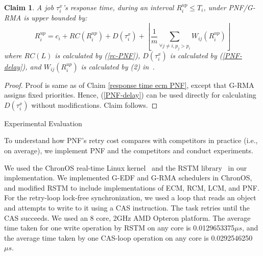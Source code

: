 \documentclass[twocolumn]{article}
\makeatletter
\def\section{\@startsection {section}{1}{\z@}{20pt plus 2pt minus 2pt}
{8pt plus 2pt minus 2pt}{\centering\normalsize\sc
\edef\@svsec{\thesection.\ }}}
\def\thesection{\Roman{section}}
\def\subsection{\@startsection {subsection}{2}{\z@}{16pt plus 2pt minus 2pt}
{6pt plus 2pt minus 2pt}{\normalsize\sl
\edef\@svsec{\thesubsection.\ }}}
\def\thesubsection{\Alph{subsection}}
\newtheorem{clm}{Claim}
\newtheorem{proof}{Proof}
\makeatother
\begin{document}
\begin{clm}\label{response rcm PNF}
A job $\tau_{i}^{x}$'s response time, during an interval $R_i^{up}\le T_{i}$, under PNF/G-RMA is upper bounded by: 
\begin{equation}
R_{i}^{up}=c_{i}+RC(R_i^{up})+D(\tau_{i}^{x})+\left\lfloor \frac{1}{m}\sum_{\forall j\ne i,p_j>p_i}W_{ij}(R_{i}^{up})\right\rfloor 
\end{equation}
where $RC(L)$ is calculated by (\ref{rc-PNF}), $D(\tau_{i}^{x})$
is calculated by (\ref{PNF-delay}), and $W_{ij}(R_{i}^{up})$
is calculated by (2) in~\cite{stmconcurrencycontrol:emsoft11}.
\end{clm}
\begin{proof}\normalfont
Proof is same as of Claim \ref{response time ecm PNF}, 
except that G-RMA assigns fixed priorities. Hence, (\ref{PNF-delay}) can be used directly for calculating $D(\tau_{i}^{x})$ without modifications. Claim follows.
\end{proof}


\section{Experimental Evaluation}\label{exp_eval}


To understand how PNF's retry cost compares with competitors in practice (i.e., on average), we implement PNF and the competitors and conduct experiments. 


We used the ChronOS real-time Linux kernel~\cite{dellinger2011chronos}
and the RSTM library~\cite{marathe2006lowering} in our implementation. We implemented G-EDF and G-RMA schedulers in ChronOS, and modified RSTM to include implementations of ECM, RCM, LCM, and PNF. For the retry-loop lock-free synchronization, we used a loop that reads an object and attempts to write to it  using a CAS  instruction. The task retries until the CAS succeeds. We used an 8 core, 2GHz AMD Opteron platform. The average time taken for one write operation by RSTM on any core is 0.0129653375$\mu s$, and the average time taken by one CAS-loop operation on any core is 0.0292546250 $\mu s$.
\end{document}
